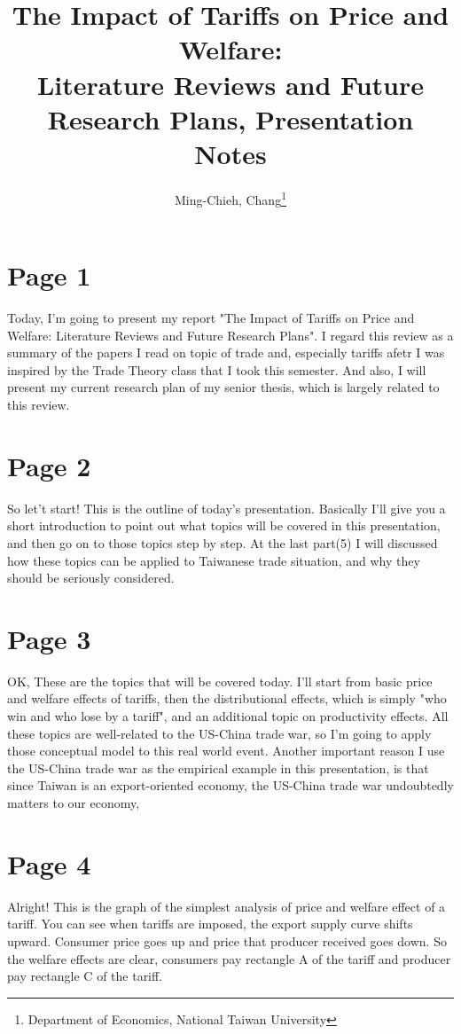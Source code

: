 \documentclass[12pt]{article}
\title{The Impact of Tariffs on Price and Welfare: \\ Literature Reviews and Future Research Plans, Presentation Notes}
\author{Ming-Chieh, Chang\thanks{Department of Economics, National Taiwan University}}
\begin{document}
\maketitle


\section*{Page 1}
Today, I'm going to present my report "The Impact of Tariffs on Price and Welfare: Literature Reviews and Future Research Plans". 
I regard this review as a summary of the papers I read on topic of trade and, especially tariffs afetr I was inspired by the Trade Theory class that I took this semester.
And also, I will present my current research plan of my senior thesis, which is largely related to this review.

\section*{Page 2}
So let't start! This is the outline of today's presentation.
Basically I'll give you a short introduction to point out what topics will be covered in this presentation, and then go on to those topics step by step.
At the last part(5) I will discussed how these topics can be applied to Taiwanese trade situation, and why they should be seriously considered.

\section*{Page 3}
OK, These are the topics that will be covered today. I'll start from basic price and welfare effects of tariffs, 
then the distributional effects, which is simply "who win and who lose by a tariff", and an additional topic on productivity effects.
All these topics are well-related to the US-China trade war, so I'm going to apply those conceptual model to this real world event.
Another important reason I use the US-China trade war as the empirical example in this presentation, is that
since Taiwan is an export-oriented economy, the US-China trade war undoubtedly matters to our economy, 

\section*{Page 4}
Alright! This is the graph of the simplest analysis of price and welfare effect of a tariff.
You can see when tariffs are imposed, the export supply curve shifts upward.
Consumer price goes up and price that producer received goes down. 
So the welfare effects are clear, consumers pay rectangle A of the tariff and producer pay rectangle C of the tariff.
\end{document}
